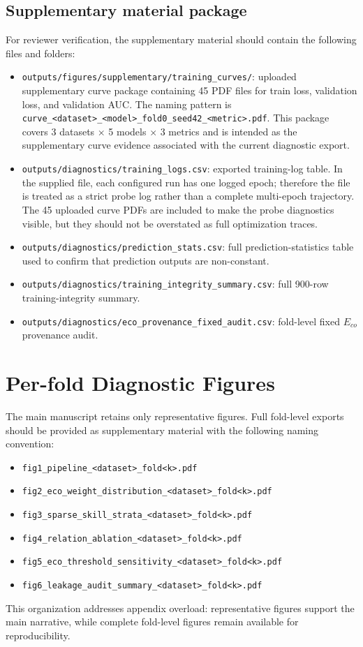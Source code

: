 \documentclass[11pt,a4paper]{article}
\newcommand{\Eco}{$E_{co}$}
\begin{document}
\subsection{Supplementary material package}
\label{app:supplementary-material}
For reviewer verification, the supplementary material should contain the following files and folders:
\begin{itemize}[leftmargin=1.5em]
\item \texttt{outputs/figures/supplementary/training\_curves/}: uploaded supplementary curve package containing 45 PDF files for train loss, validation loss, and validation AUC. The naming pattern is \texttt{curve\_<dataset>\_<model>\_fold0\_seed42\_<metric>.pdf}. This package covers 3 datasets $\times$ 5 models $\times$ 3 metrics and is intended as the supplementary curve evidence associated with the current diagnostic export.
\item \texttt{outputs/diagnostics/training\_logs.csv}: exported training-log table. In the supplied file, each configured run has one logged epoch; therefore the file is treated as a strict probe log rather than a complete multi-epoch trajectory. The 45 uploaded curve PDFs are included to make the probe diagnostics visible, but they should not be overstated as full optimization traces.
\item \texttt{outputs/diagnostics/prediction\_stats.csv}: full prediction-statistics table used to confirm that prediction outputs are non-constant.
\item \texttt{outputs/diagnostics/training\_integrity\_summary.csv}: full 900-row training-integrity summary.
\item \texttt{outputs/diagnostics/eco\_provenance\_fixed\_audit.csv}: fold-level fixed \Eco{} provenance audit.
\end{itemize}

\section{Per-fold Diagnostic Figures}
The main manuscript retains only representative figures. Full fold-level exports should be provided as supplementary material with the following naming convention:
\begin{itemize}[leftmargin=1.5em]
\item \texttt{fig1\_pipeline\_<dataset>\_fold<k>.pdf}
\item \texttt{fig2\_eco\_weight\_distribution\_<dataset>\_fold<k>.pdf}
\item \texttt{fig3\_sparse\_skill\_strata\_<dataset>\_fold<k>.pdf}
\item \texttt{fig4\_relation\_ablation\_<dataset>\_fold<k>.pdf}
\item \texttt{fig5\_eco\_threshold\_sensitivity\_<dataset>\_fold<k>.pdf}
\item \texttt{fig6\_leakage\_audit\_summary\_<dataset>\_fold<k>.pdf}
\end{itemize}
This organization addresses appendix overload: representative figures support the main narrative, while complete fold-level figures remain available for reproducibility.
\end{document}

